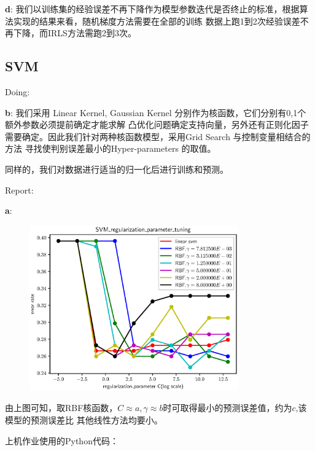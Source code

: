 \documentclass{article}
\begin{document}
\textbf{d}:
我们以训练集的经验误差不再下降作为模型参数迭代是否终止的标准，根据算法实现的结果来看，随机梯度方法需要在全部的训练
数据上跑1到2次经验误差不再下降，而IRLS方法需跑2到3次。

\subsection{SVM}
Doing:

\textbf{b}:
我们采用 Linear Kernel, Gaussian Kernel%
分别作为核函数，它们分别有0,1个额外参数必须提前确定才能求解
凸优化问题确定支持向量，另外还有正则化因子需要确定。因此我们针对两种核函数模型，采用Grid Search 与控制变量相结合的方法
寻找使判别误差最小的Hyper-parameters 的取值。


同样的，我们对数据进行适当的归一化后进行训练和预测。

Report:

\textbf{a}:
\begin{figure}[!ht]
\centering
\includegraphics[width=9cm]{SVM_regularization_parameter_tuning.eps}
\end{figure}

由上图可知，取RBF核函数，$C \approx a,\gamma \approx b$时可取得最小的预测误差值，约为$c$,该模型的预测误差比
其他线性方法均要小。

上机作业使用的Python代码：



\begin{equation}
\end{equation}
\end{document}
